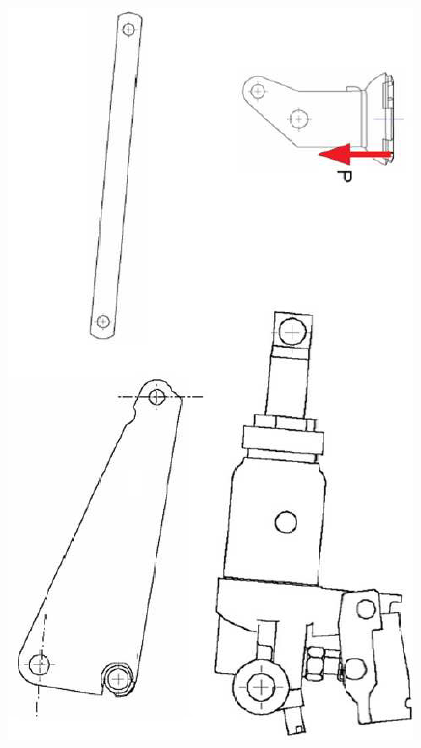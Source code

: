 \documentclass[10pt]{article}
\begin{document}
\begin{center}
\includegraphics[height=.9\textheight]{images/img9.png}
\end{center}
\end{document}
